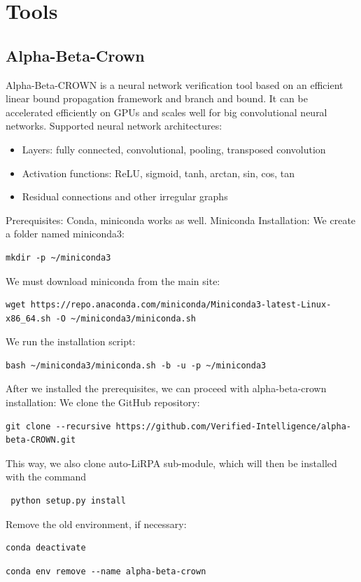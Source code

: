 \documentclass{article}
\begin{document}
\section{Tools}
\subsection{Alpha-Beta-Crown \cite{alpha-beta}}
Alpha-Beta-CROWN is a neural network verification tool based on an efficient linear bound propagation framework and branch and bound. It can be accelerated efficiently on GPUs and scales well for big convolutional neural networks.\newline
Supported neural network architectures:
\begin{itemize}
\item Layers: fully connected, convolutional, pooling, transposed convolution
\item Activation functions: ReLU, sigmoid, tanh, arctan, sin, cos, tan
\item Residual connections and other irregular graphs
\end{itemize}
\newline
Prerequisites: Conda, miniconda works as well.\newline
Miniconda Installation:
We create a folder named miniconda3:

\begin{verbatim}mkdir -p ~/miniconda3\end{verbatim}
We must download miniconda from the main site:
\begin{verbatim}wget https://repo.anaconda.com/miniconda/Miniconda3-latest-Linux-x86_64.sh -O ~/miniconda3/miniconda.sh\end{verbatim}
We run the installation script:
\begin{verbatim}bash ~/miniconda3/miniconda.sh -b -u -p ~/miniconda3
\end{verbatim}

After we installed the prerequisites, we can proceed with alpha-beta-crown installation:
We clone the GitHub repository:
\begin{verbatim}git clone --recursive https://github.com/Verified-Intelligence/alpha-beta-CROWN.git\end{verbatim}
This way, we also clone auto-LiRPA sub-module, which will then be installed with the command \begin{verbatim} python setup.py install\end{verbatim}
Remove the old environment, if necessary:
\begin{verbatim}conda deactivate\end{verbatim}
\begin{verbatim}conda env remove --name alpha-beta-crown\end{verbatim}
\end{document}
